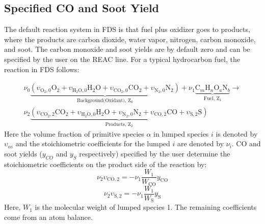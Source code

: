 \subsection{Specified CO and Soot Yield}
The default reaction system in FDS is that fuel plus oxidizer goes to products, where the products are carbon dioxide, water vapor, nitrogen, carbon monoxide, and soot. The carbon monoxide and soot yields are by default zero and can be specified by the user on the {\ct REAC} line. For a typical hydrocarbon fuel, the reaction in FDS follows:

\begin{eqnarray}
\nu_{0}\underbrace{(\upsilon_{\mathrm{O}_{2},0}\mathrm{O}_2+\upsilon_{\mathrm{H}_{2}\mathrm{O},0}\mathrm{H}_2\mathrm{O}+\upsilon_{\mathrm{CO}_{2},0}\mathrm{CO}_2+\upsilon_{\mathrm{N}_{2},0}\mathrm{N}_2)}_\text{Background(Oxidant),~Z$_0$}+\nu_{1}\underbrace{\mbox{C}_m\mbox{H}_n\mbox{O}_a\mbox{N}_b}_\text{Fuel,~Z$_1$} \rightarrow \\
\nonumber \nu_{2}\underbrace{(\upsilon_{\mathrm{CO}_{2},2}\mathrm{CO}_2+\upsilon_{\mathrm{H}_{2}\mathrm{O},0}\mathrm{H}_2\mathrm{O}+\upsilon_{\mathrm{N}_{2},0}\mathrm{N}_2+\upsilon_{\mathrm{CO},2}\mathrm{CO}+\upsilon_{\mathrm{S},2}\mathrm{S})}_\text{Products,~Z$_2$}
\end{eqnarray}
Here the volume fraction of primitive species $\alpha$ in lumped species $i$ is denoted by $\upsilon_{\alpha i}$ and the stoichiometric coefficients for the lumped $i$ are denoted by $\nu_{i}$. CO and soot yields ($y_{CO}$ and $y_{S}$ respectively) specified by the user determine the stoichiometric coefficients on the product side of the reaction by:
\begin{equation}\label{eq:co_yield}
\nu_{2}\upsilon_{\mathrm{CO},2}=-\nu_{1}\frac{W_1}{W_{\mathrm{CO}}}y_{\mathrm{CO}}
\end{equation}
\begin{equation}\label{eq:soot_yield}
\nu_{2}\upsilon_{\mathrm{S},2}=-\nu_{1}\frac{W_1}{W_{\mathrm{S}}}y_{\mathrm{S}}
\end{equation}
Here, $W_{1}$ is the molecular weight of lumped species 1. The remaining coefficients come from an atom balance.


